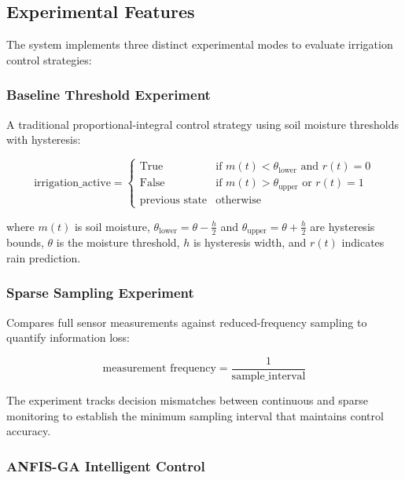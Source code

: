 \subsection{Experimental Features}

The system implements three distinct experimental modes to evaluate irrigation control strategies:

\subsubsection{Baseline Threshold Experiment}

A traditional proportional-integral control strategy using soil moisture thresholds with hysteresis:

\begin{equation}
\text{irrigation\_active} = \begin{cases}
\text{True} & \text{if } m(t) < \theta_{\text{lower}} \text{ and } r(t) = 0 \\
\text{False} & \text{if } m(t) > \theta_{\text{upper}} \text{ or } r(t) = 1 \\
\text{previous state} & \text{otherwise}
\end{cases}
\end{equation}

where $m(t)$ is soil moisture, $\theta_{\text{lower}} = \theta - \frac{h}{2}$ and $\theta_{\text{upper}} = \theta + \frac{h}{2}$ are hysteresis bounds, $\theta$ is the moisture threshold, $h$ is hysteresis width, and $r(t)$ indicates rain prediction.

\subsubsection{Sparse Sampling Experiment}

Compares full sensor measurements against reduced-frequency sampling to quantify information loss:

\begin{equation}
\text{measurement frequency} = \frac{1}{\text{sample\_interval}}
\end{equation}

The experiment tracks decision mismatches between continuous and sparse monitoring to establish the minimum sampling interval that maintains control accuracy.

\subsubsection{ANFIS-GA Intelligent Control}

